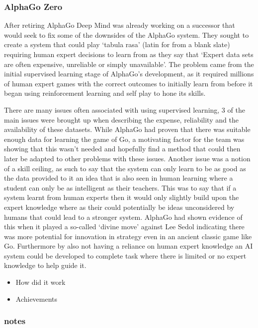 \documentclass[a4paper]{article}
\begin{document}
\subsubsection{AlphaGo Zero}
After retiring AlphaGo Deep Mind was already working on a successor that would seek to fix some of the downsides of the AlphaGo system.
They sought to create a system that could play `tabula rasa' (latin for from a blank slate) requiring human expert decisions to learn from as they say that `Expert data sets are often expensive, unreliable or simply unavailable'\cite{alphaGoZero}.
The problem came from the initial supervised learning stage of AlphaGo's development, as it required millions of human expert games with the correct outcomes to initially learn from before it began using reinforcement learning and self play to hone its skills.
\par
There are many issues often associated with using supervised learning, 3 of the main issues were brought up when describing the expense, reliability and the availability of these datasets.
While AlphaGo had proven that there was suitable enough data for learning the game of Go, a motivating factor for the team was showing that this wasn't needed and hopefully find a method that could then later be adapted to other problems with these issues.
Another issue was a notion of a skill ceiling, as such to say that the system can only learn to be as good as the data provided to it an idea that is also seen in human learning where a student can only be as intelligent as their teachers.
This was to say that if a system learnt from human experts then it would only slightly build upon the expert knowledge where as their could potentially be ideas unconsidered by humans that could lead to a stronger system.
AlphaGo had shown evidence of this when it played a so-called `divine move' against Lee Sedol indicating there was more potential for innovation in strategy even in an ancient classic game like Go.
Furthermore by also not having a reliance on human expert knowledge an AI system could be developed to complete task where there is limited or no expert knowledge to help guide it.
\par
\begin{itemize}
    \item How did it work
    \item Achievements
\end{itemize}

\subsubsection{notes}
\end{document}
